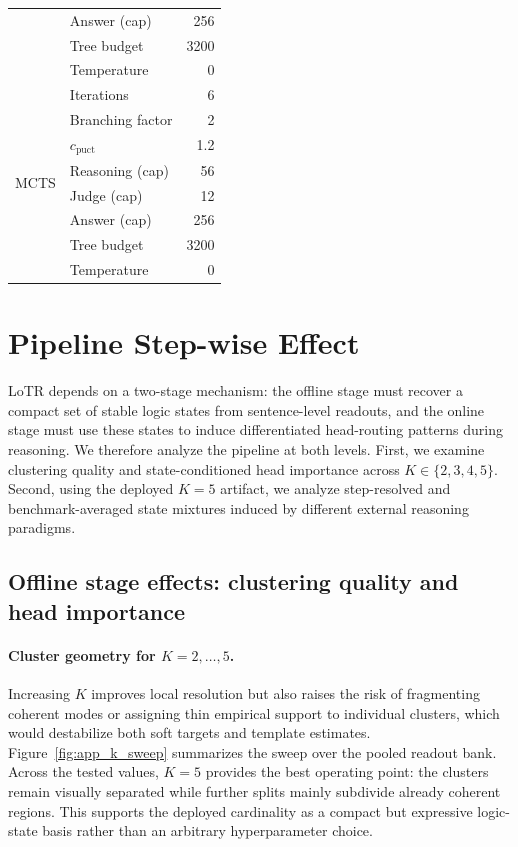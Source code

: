 \begin{table}[t]
\begin{minipage}[t]{0.48\textwidth}
\begin{tabular}{@{}l l r@{}}
 & Answer (cap) & 256 \\
 & Tree budget & 3200 \\
 & Temperature & 0 \\
\midrule
\multirow{8}{*}{MCTS} & Iterations & 6 \\
 & Branching factor & 2 \\
 & \(c_{\mathrm{puct}}\) & 1.2 \\
 & Reasoning (cap) & 56 \\
 & Judge (cap) & 12 \\
 & Answer (cap) & 256 \\
 & Tree budget & 3200 \\
 & Temperature & 0 \\
\bottomrule
\end{tabular}
\end{minipage}
\end{table}

\clearpage
{}

\section{Pipeline Step-wise Effect}
\label{app:pipeline_effect}

LoTR depends on a two-stage mechanism: the offline stage must recover a compact set of stable logic states from sentence-level readouts, and the online stage must use these states to induce differentiated head-routing patterns during reasoning. We therefore analyze the pipeline at both levels. First, we examine clustering quality and state-conditioned head importance across \(K\in\{2,3,4,5\}\). Second, using the deployed \(K{=}5\) artifact, we analyze step-resolved and benchmark-averaged state mixtures induced by different external reasoning paradigms.

\subsection{Offline stage effects: clustering quality and head importance}
\label{app:pipeline_effect_offline}

\paragraph{Cluster geometry for \(K{=}2,\dots,5\).}
Increasing \(K\) improves local resolution but also raises the risk of fragmenting coherent modes or assigning thin empirical support to individual clusters, which would destabilize both soft targets and template estimates. Figure~\ref{fig:app_k_sweep} summarizes the sweep over the pooled readout bank. Across the tested values, \(K{=}5\) provides the best operating point: the clusters remain visually separated while further splits mainly subdivide already coherent regions. This supports the deployed cardinality as a compact but expressive logic-state basis rather than an arbitrary hyperparameter choice.

